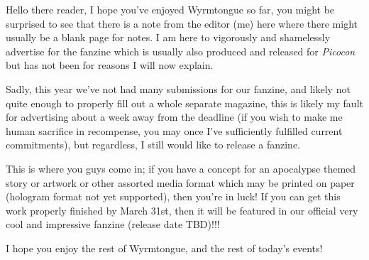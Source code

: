 Hello there reader, I hope you've enjoyed Wyrmtongue so far, you might be surprised to see that there is a note from the editor (me) here where there might usually be a blank page for notes. I am here to vigorously and shamelessly advertise for the fanzine which is usually also produced and released for \emph{Picocon} but has not been for reasons I will now explain.

Sadly, this year we've not had many submissions for our fanzine, and likely not quite enough to properly fill out a whole separate magazine, this is likely my fault for advertising about a week away from the deadline (if you wish to make me human sacrifice in recompense, you may once I've sufficiently fulfilled current commitments), but regardless, I still would like to release a fanzine.

This is where you guys come in; if you have a concept for an apocalypse themed story or artwork or other assorted media format which may be printed on paper (hologram format not yet supported), then you're in luck! If you can get this work properly finished by March 31st, then it will be featured in our official very cool and impressive fanzine (release date TBD)!!!

I hope you enjoy the rest of Wyrmtongue, and the rest of today's events!